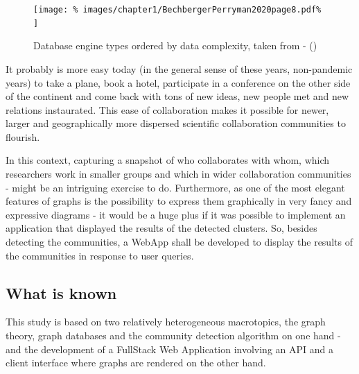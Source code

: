 \begin{figure}[H]%
	\centering%
	\texttt{[image: \%
		images/chapter1/BechbergerPerryman2020page8.pdf\%
	]}%
	\caption[Database engine types ordered by data complexity]{Database engine types ordered by data complexity, taken from  - \citeauthor{BechbergerPerryman2020} (\citeyear{BechbergerPerryman2020})}%
	\label{fig:BechbergerPerryman2020page8}%
\end{figure}%

It probably is more easy today (in the general sense of these years, non-pandemic years) to take a plane, book a hotel, participate in a conference on the other side of the continent and come back with tons of new ideas, new people met and new relations instaurated.
This ease of collaboration makes it possible for newer, larger and geographically more dispersed scientific collaboration communities to flourish.

In this context, capturing a snapshot of who collaborates with whom, which researchers work in smaller groups and which in wider collaboration communities - might be an intriguing exercise to do. Furthermore, as one of the most elegant features of graphs is the possibility to express them graphically in very fancy and expressive diagrams - it would be a huge plus if it was possible to implement an application that displayed the results of the detected clusters.
So, besides detecting the communities, a \gls{WebApp} shall be developed to display the results of the communities in response to user queries.

\subsection{What is known} \label{subsection:Introduction/Context/Whatisknown}
This study is based on two relatively heterogeneous macrotopics, the graph theory, graph databases and the community detection algorithm on one hand - and the development of a \gls{FullStack} \gls{Web Application} involving an \acrshort{API} and a client interface where graphs are rendered on the other hand.

